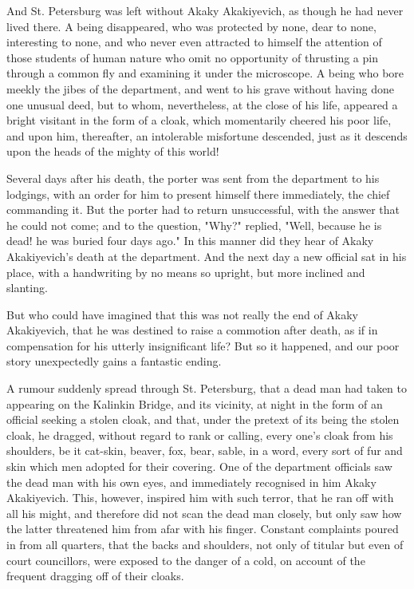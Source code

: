 And St. Petersburg was left without Akaky Akakiyevich, as though he
had never lived there. A being disappeared, who was protected by none,
dear to none, interesting to none, and who never even attracted to
himself the attention of those students of human nature who omit no
opportunity of thrusting a pin through a common fly and examining it
under the microscope. A being who bore meekly the jibes of the
department, and went to his grave without having done one unusual
deed, but to whom, nevertheless, at the close of his life, appeared a
bright visitant in the form of a cloak, which momentarily cheered his
poor life, and upon him, thereafter, an intolerable misfortune
descended, just as it descends upon the heads of the mighty of this
world!

Several days after his death, the porter was sent from the department
to his lodgings, with an order for him to present himself there
immediately, the chief commanding it. But the porter had to return
unsuccessful, with the answer that he could not come; and to the
question, "Why?" replied, "Well, because he is dead! he was buried
four days ago." In this manner did they hear of Akaky Akakiyevich's
death at the department. And the next day a new official sat in his
place, with a handwriting by no means so upright, but more inclined
and slanting.

But who could have imagined that this was not really the end of Akaky
Akakiyevich, that he was destined to raise a commotion after death, as
if in compensation for his utterly insignificant life? But so it
happened, and our poor story unexpectedly gains a fantastic ending.

A rumour suddenly spread through St. Petersburg, that a dead man had
taken to appearing on the Kalinkin Bridge, and its vicinity, at night
in the form of an official seeking a stolen cloak, and that, under the
pretext of its being the stolen cloak, he dragged, without regard to
rank or calling, every one's cloak from his shoulders, be it cat-skin,
beaver, fox, bear, sable, in a word, every sort of fur and skin which
men adopted for their covering. One of the department officials saw
the dead man with his own eyes, and immediately recognised in him
Akaky Akakiyevich. This, however, inspired him with such terror, that
he ran off with all his might, and therefore did not scan the dead man
closely, but only saw how the latter threatened him from afar with his
finger. Constant complaints poured in from all quarters, that the
backs and shoulders, not only of titular but even of court
councillors, were exposed to the danger of a cold, on account of the
frequent dragging off of their cloaks.

